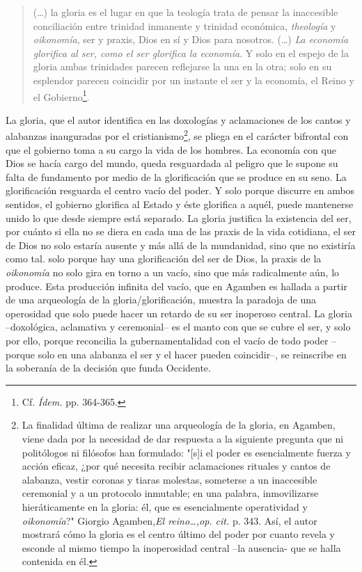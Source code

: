 \documentclass{book}
\begin{document}
\begin{quote}
(\dots) la gloria es el lugar en que la teología trata de pensar la
inaccesible conciliación entre trinidad inmanente y trinidad económica,
\emph{theología} y \emph{oikonomía}, ser y praxis, Dios en sí y Dios
para nosotros. (\dots) \emph{La economía glorifica al ser, como el
ser glorifica la economía}. Y solo en el espejo de la gloria ambas
trinidades parecen reflejarse la una en la otra; solo en su esplendor
parecen coincidir por un instante el ser y la economía, el Reino y el
Gobierno\footnote{Cf. \emph{Ídem.} pp. 364-365.}.
\end{quote}

La gloria, que el autor identifica en las doxologías y aclamaciones de
los cantos y alabanzas inauguradas por el cristianismo\footnote{La
  finalidad última de realizar una arqueología de la gloria, en Agamben,
  viene dada por la necesidad de dar respuesta a la siguiente pregunta
  que ni politólogos ni filósofos han formulado: "{[}s{]}i el poder es
  esencialmente fuerza y acción eficaz, ¿por qué necesita recibir
  aclamaciones rituales y cantos de alabanza, vestir coronas y tiaras
  molestas, someterse a un inaccesible ceremonial y a un protocolo
  inmutable; en una palabra, inmovilizarse hieráticamente en la gloria:
  él, que es esencialmente operatividad y \emph{oikonomía}?" Giorgio
  Agamben,\emph{El reino\ldots,op. cit.} p. 343. Así, el autor mostrará
  cómo la gloria es el centro último del poder por cuanto revela y
  esconde al mismo tiempo la inoperosidad central --la ausencia- que se
  halla contenida en él.}, se pliega en el carácter bifrontal con que el
gobierno toma a su cargo la vida de los hombres. La economía con que
Dios se hacía cargo del mundo, queda resguardada al peligro que le
supone su falta de fundamento por medio de la glorificación que se
produce en su seno. La glorificación resguarda el centro vacío del
poder. Y solo porque discurre en ambos sentidos, el gobierno glorifica
al Estado y éste glorifica a aquél, puede mantenerse unido lo que desde
siempre está separado. La gloria justifica la existencia del ser, por
cuánto si ella no se diera en cada una de las praxis de la vida
cotidiana, el ser de Dios no solo estaría ausente y más allá de la
mundanidad, sino que no existiría como tal. solo porque hay una
glorificación del ser de Dios, la praxis de la \emph{oikonomía} no solo
gira en torno a un vacío, sino que más radicalmente aún, lo produce.
Esta producción infinita del vacío, que en Agamben es hallada a partir
de una arqueología de la gloria/glorificación, muestra la paradoja de
una operosidad que solo puede hacer un retardo de su ser inoperoso
central. La gloria --doxológica, aclamativa y ceremonial-- es el manto
con que se cubre el ser, y solo por ello, porque reconcilia la
gubernamentalidad con el vacío de todo poder --porque solo en una
alabanza el ser y el hacer pueden coincidir--, se reinscribe en la
soberanía de la decisión que funda Occidente.
\end{document}
